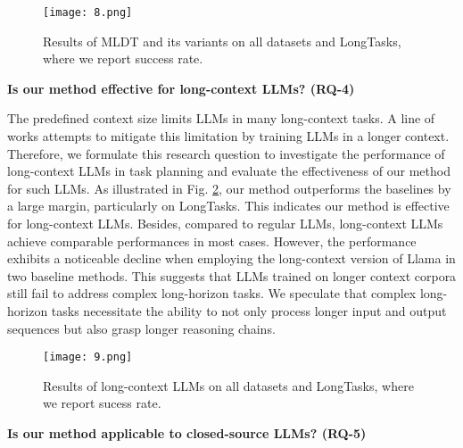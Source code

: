 \begin{figure}[h]
    \centering
    \texttt{[image: 8.png]}
    \caption{Results of MLDT and its variants on all datasets and LongTasks, where we report success rate.}
    \label{Figure 8}
\end{figure}

\noindent \textbf{Is our method effective for long-context LLMs? (RQ-4)}

The predefined context size limits LLMs in many long-context tasks. A line of works \cite{DBLP:journals/corr/abs-2307-03170,DBLP:journals/corr/abs-2309-12307} attempts to mitigate this limitation by training LLMs in a longer context. Therefore, we formulate this research question to investigate the performance of long-context LLMs in task planning and evaluate the effectiveness of our method for such LLMs. As illustrated in Fig. \ref{Figure 9}, our method outperforms the baselines by a large margin, particularly on LongTasks. This indicates our method is effective for long-context LLMs. Besides, compared to regular LLMs, long-context LLMs achieve comparable performances in most cases. However, the performance exhibits a noticeable decline when employing the long-context version of Llama in two baseline methods. This suggests that LLMs trained on longer context corpora still fail to address complex long-horizon tasks. We speculate that complex long-horizon tasks necessitate the ability to not only process longer input and output sequences but also grasp longer reasoning chains.

\begin{figure}[h]
    \centering
    \texttt{[image: 9.png]}
    \caption{Results of long-context LLMs on all datasets and LongTasks, where we report sucess rate.}
    \label{Figure 9}
\end{figure}

\noindent \textbf{Is our method applicable to closed-source LLMs? (RQ-5)}

